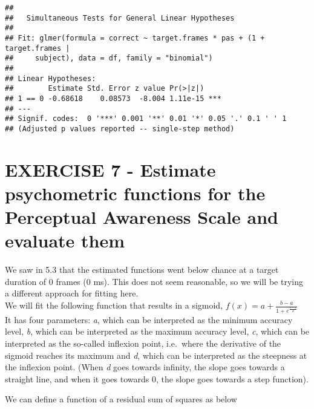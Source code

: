 \documentclass[
]{article}
\begin{document}
\begin{verbatim}
## 
##   Simultaneous Tests for General Linear Hypotheses
## 
## Fit: glmer(formula = correct ~ target.frames * pas + (1 + target.frames | 
##     subject), data = df, family = "binomial")
## 
## Linear Hypotheses:
##        Estimate Std. Error z value Pr(>|z|)    
## 1 == 0 -0.68618    0.08573  -8.004 1.11e-15 ***
## ---
## Signif. codes:  0 '***' 0.001 '**' 0.01 '*' 0.05 '.' 0.1 ' ' 1
## (Adjusted p values reported -- single-step method)
\end{verbatim}

\hypertarget{exercise-7---estimate-psychometric-functions-for-the-perceptual-awareness-scale-and-evaluate-them}{%
\section{EXERCISE 7 - Estimate psychometric functions for the Perceptual
Awareness Scale and evaluate
them}\label{exercise-7---estimate-psychometric-functions-for-the-perceptual-awareness-scale-and-evaluate-them}}

We saw in 5.3 that the estimated functions went below chance at a target
duration of 0 frames (0 ms). This does not seem reasonable, so we will
be trying a different approach for fitting here.\\
We will fit the following function that results in a sigmoid,
\(f(x) = a + \frac {b - a} {1 + e^{\frac {c-x} {d}}}\)\\
It has four parameters: \emph{a}, which can be interpreted as the
minimum accuracy level, \emph{b}, which can be interpreted as the
maximum accuracy level, \emph{c}, which can be interpreted as the
so-called inflexion point, i.e.~where the derivative of the sigmoid
reaches its maximum and \emph{d}, which can be interpreted as the
steepness at the inflexion point. (When \emph{d} goes towards infinity,
the slope goes towards a straight line, and when it goes towards 0, the
slope goes towards a step function).

We can define a function of a residual sum of squares as below
\end{document}
